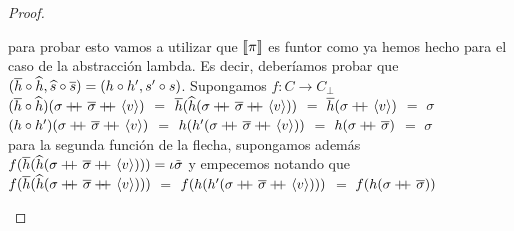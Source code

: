 \begin{proof}
\begin{itemize}
\begin{itemize}
\begin{itemize}
para probar esto vamos a utilizar que $\llbracket \pi \rrbracket$ es funtor como ya hemos hecho
para el caso de la abstracci\'on lambda. Es decir, deber\'iamos probar que 
$(\overline{h} \circ \widehat{h},\widehat{s} \circ \overline{s}) = (h \circ h',s' \circ s)$. Supongamos
$f : C \rightarrow C_\bot$\\

$(\overline{h} \circ \widehat{h}) (\sigma +\kern-1.3ex+\kern0.8ex \overline{\sigma} +\kern-1.3ex+\kern0.8ex \langle v \rangle)$ $=$
$\overline{h} (\widehat{h} (\sigma +\kern-1.3ex+\kern0.8ex \overline{\sigma} +\kern-1.3ex+\kern0.8ex \langle v \rangle))$ $=$
$\overline{h} (\sigma +\kern-1.3ex+\kern0.8ex \langle v \rangle)$ $=$ $\sigma$\\

$(h \circ h') (\sigma +\kern-1.3ex+\kern0.8ex \overline{\sigma} +\kern-1.3ex+\kern0.8ex \langle v \rangle)$ $=$
$h (h' (\sigma +\kern-1.3ex+\kern0.8ex \overline{\sigma} +\kern-1.3ex+\kern0.8ex \langle v \rangle))$ $=$
$h (\sigma +\kern-1.3ex+\kern0.8ex \overline{\sigma})$ $=$ $\sigma$\\

para la segunda funci\'on de la flecha, supongamos adem\'as 
$f(\overline{h}(\widehat{h} (\sigma +\kern-1.3ex+\kern0.8ex \overline{\sigma} +\kern-1.3ex+\kern0.8ex \langle v \rangle))) = \iota \tilde{\sigma}$ y empecemos
notando que \\
$f(\overline{h}(\widehat{h} (\sigma +\kern-1.3ex+\kern0.8ex \overline{\sigma} +\kern-1.3ex+\kern0.8ex \langle v \rangle)))$
$=$ $f(h(h'(\sigma +\kern-1.3ex+\kern0.8ex \overline{\sigma} +\kern-1.3ex+\kern0.8ex \langle v \rangle)))$ $=$
$f(h(\sigma +\kern-1.3ex+\kern0.8ex \overline{\sigma}))$\\


\end{itemize}
\end{itemize}
\end{itemize}
\end{proof}

